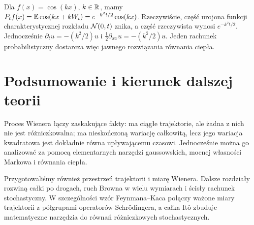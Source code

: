 \begin{przyklad}
Dla $f(x)=\cos(kx)$, $k\in\mathbb{R}$, mamy
$P_tf(x)=\mathbb{E}\cos(kx+kW_t)
=e^{-k^2t/2}\cos(kx)$.
Rzeczywiście, część urojona funkcji charakterystycznej
rozkładu $\mathcal{N}(0,t)$ znika, a część rzeczywista
wynosi $e^{-k^2t/2}$. Jednocześnie
$\partial_tu=-(k^2/2)u$ i
$\frac12\partial_{xx}u=-(k^2/2)u$.
Jeden rachunek probabilistyczny dostarcza więc
jawnego rozwiązania równania ciepła.
\end{przyklad}

\section{Podsumowanie i kierunek dalszej teorii}
Proces Wienera łączy zaskakujące fakty: ma ciągłe
trajektorie, ale żadna z nich nie jest różniczkowalna;
ma nieskończoną wariację całkowitą, lecz jego wariacja
kwadratowa jest dokładnie równa upływającemu czasowi.
Jednocześnie można go analizować za pomocą elementarnych
narzędzi gaussowskich, mocnej własności Markowa i
równania ciepła.

Przygotowaliśmy również przestrzeń trajektorii i miarę Wienera.
Dalsze rozdziały rozwiną całki po drogach, ruch Browna
w wielu wymiarach i ścisły rachunek stochastyczny.
W szczególności wzór Feynmana--Kaca połączy
ważone miary trajektorii z półgrupami operatorów
Schrödingera, a całka Itô zbuduje matematyczne
narzędzia do równań różniczkowych stochastycznych.


